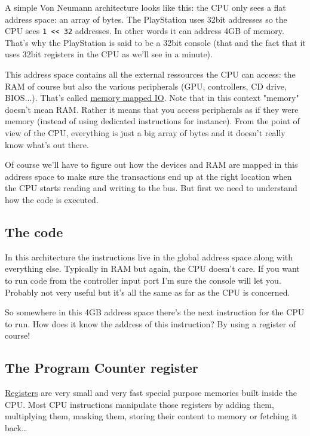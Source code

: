 \documentclass[a4paper]{article}
\newcommand{\code}[1] {\texttt{#1}}
\begin{document}
A simple Von Neumann architecture looks like this: the CPU only sees a
flat address space: an array of bytes. The PlayStation uses 32bit
addresses so the CPU sees \code{1 << 32} addresses. In other words it
can address 4GB of memory. That's why the PlayStation is said to be a
32bit console (that and the fact that it uses 32bit registers in the
CPU as we'll see in a minute).

This address space contains all the external ressources the CPU can
access: the RAM of course but also the various peripherals (GPU,
controllers, CD drive, BIOS...). That's called
\href{https://en.wikipedia.org/wiki/Memory-mapped_I/O}{memory mapped
  IO}. Note that in this context "memory" doesn't mean RAM. Rather it
means that you access peripherals as if they were memory (instead of
using dedicated instructions for instance). From the point of view of
the CPU, everything is just a big array of bytes and it doesn't really
know what's out there.

Of course we'll have to figure out how the devices and RAM are mapped
in this address space to make sure the transactions end up at the
right location when the CPU starts reading and writing to the bus. But
first we need to understand how the code is executed.

\subsection{The code}

In this architecture the instructions live in the global address space
along with everything else. Typically in RAM but again, the CPU
doesn't care. If you want to run code from the controller input port
I'm sure the console will let you. Probably not very useful but it's
all the same as far as the CPU is concerned.

So somewhere in this 4GB address space there's the next instruction
for the CPU to run. How does it know the address of this instruction?
By using a register of course!

\subsection{The Program Counter register}

\href{https://en.wikipedia.org/wiki/Processor_register}{Registers} are
very small and very fast special purpose memories built inside the
CPU. Most CPU instructions manipulate those registers by adding them,
multiplying them, masking them, storing their content to memory or
fetching it back\dots{}
\end{document}
